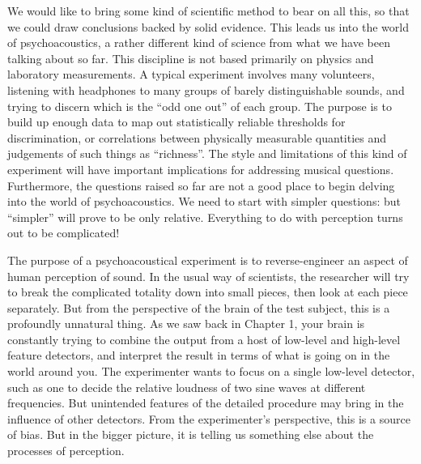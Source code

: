   We would like to bring some kind of scientific method to bear on all this, so 
  that we could draw conclusions backed by solid evidence. This leads us into 
  the world of psychoacoustics, a rather different kind of science from what we 
  have been talking about so far. This discipline is not based primarily on 
  physics and laboratory measurements. A typical experiment involves many 
  volunteers, listening with headphones to many groups of barely 
  distinguishable sounds, and trying to discern which is the ``odd one out'' of 
  each group. The purpose is to build up enough data to map out statistically 
  reliable thresholds for discrimination, or correlations between physically 
  measurable quantities and judgements of such things as ``richness''. The 
  style and limitations of this kind of experiment will have important 
  implications for addressing musical questions. Furthermore, the questions 
  raised so far are not a good place to begin delving into the world of 
  psychoacoustics. We need to start with simpler questions: but ``simpler'' 
  will prove to be only relative. Everything to do with perception turns out to 
  be complicated! 

  The purpose of a psychoacoustical experiment is to reverse-engineer an aspect 
  of human perception of sound. In the usual way of scientists, the researcher 
  will try to break the complicated totality down into small pieces, then look 
  at each piece separately. But from the perspective of the brain of the test 
  subject, this is a profoundly unnatural thing. As we saw back in Chapter 1, 
  your brain is constantly trying to combine the output from a host of 
  low-level and high-level feature detectors, and interpret the result in terms 
  of what is going on in the world around you. The experimenter wants to focus 
  on a single low-level detector, such as one to decide the relative loudness 
  of two sine waves at different frequencies. But unintended features of the 
  detailed procedure may bring in the influence of other detectors. From the 
  experimenter's perspective, this is a source of bias. But in the bigger 
  picture, it is telling us something else about the processes of perception. 

